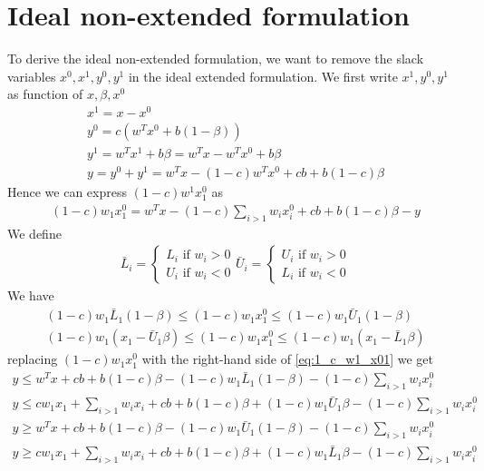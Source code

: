 \documentclass{article}
\begin{document}
\section{Ideal non-extended formulation}
To derive the ideal non-extended formulation, we want to remove the slack variables $x^0, x^1, y^0, y^1$ in the ideal extended formulation. We first write $x^1, y^0, y^1$ as function of $x, \beta, x^0$
\begin{subequations}
\begin{align}
	x^1 = x - x^0\\
	y^0 = c(w^Tx^0 + b(1-\beta))\\
	y^1 = w^Tx^1 + b\beta = w^Tx - w^Tx^0 + b\beta\\
	y = y^0 + y^1 = w^Tx - (1-c)w^Tx^0 + cb + b(1-c)\beta
\end{align}
\end{subequations}
Hence we can express $(1-c)w^1x^0_1$ as
\begin{align}
	(1-c)w_1x^0_1 = w^Tx - (1-c)\sum_{i>1}w_ix^0_i + cb  + b(1-c)\beta - y\label{eq:1_c_w1_x01}
\end{align}
We define 
\begin{align}
	\bar{L}_i = \begin{cases}L_i\text{ if } w_i > 0\\U_i\text{ if } w_i < 0\end{cases}
	\bar{U}_i = \begin{cases}U_i\text{ if } w_i > 0\\L_i\text{ if } w_i < 0\end{cases}
\end{align}
We have
\begin{subequations}
\begin{align}
	(1-c)w_1\bar{L}_1(1-\beta) \le (1-c)w_1x^0_1\le (1-c)w_1\bar{U}_1(1-\beta)\\
	(1-c)w_1(x_1-\bar{U}_1\beta)\le (1-c)w_1x^0_1\le(1-c)w_1(x_1-\bar{L}_1\beta)
\end{align}
\end{subequations}
replacing $(1-c)w_1x^0_1$ with the right-hand side of \eqref{eq:1_c_w1_x01} we get
\begin{subequations}
	\begin{align}
		y \le w^Tx + cb + b(1-c)\beta - (1-c)w_1\bar{L}_1(1-\beta)-(1-c)\sum_{i>1}w_ix^0_i\\
		y \le cw_1x_1 + \sum_{i>1}w_ix_i + cb + b(1-c)\beta + (1-c)w_1\bar{U}_1\beta - (1-c)\sum_{i>1}w_ix^0_i\\
		y \ge w^Tx + cb + b(1-c)\beta - (1-c)w_1\bar{U}_1(1-\beta)-(1-c)\sum_{i>1}w_ix^0_i\\
		y \ge cw_1x_1 + \sum_{i>1}w_ix_i + cb + b(1-c)\beta + (1-c)w_1\bar{L}_1\beta - (1-c)\sum_{i>1}w_ix^0_i
	\end{align}
\end{subequations}
\end{document}

